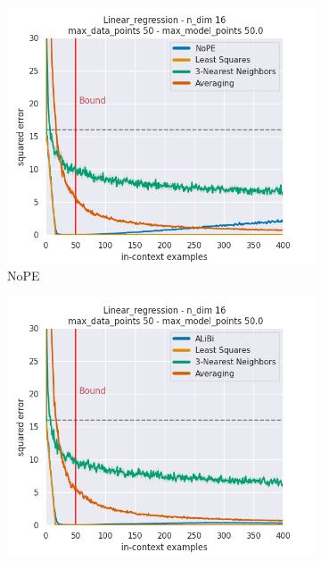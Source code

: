 \documentclass[letterpaper]{article} %
\begin{document}
\begin{figure}[tp]
    \centering
    \begin{subfigure}[t]{0.24\linewidth}
        \includegraphics[width=\linewidth]{AnonymousSubmission/LaTeX/imgs/experiments/linear-regression/nope.png}
        \caption{NoPE}
    \end{subfigure}
    \begin{subfigure}[t]{0.24\linewidth}
        \includegraphics[width=\linewidth]{AnonymousSubmission/LaTeX/imgs/experiments/linear-regression/alibi.png}

\end{subfigure}
\end{figure}
\end{document}
